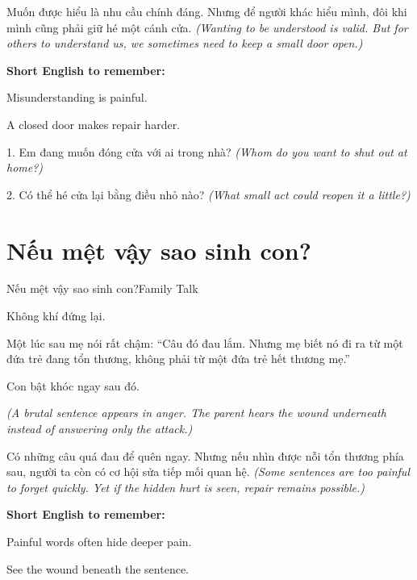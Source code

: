 \begin{baihoc}
Muốn được hiểu là nhu cầu chính đáng. Nhưng để người khác hiểu mình, đôi khi mình cũng phải giữ hé một cánh cửa.
\textit{(Wanting to be understood is valid. But for others to understand us, we sometimes need to keep a small door open.)}
\end{baihoc}

\begin{ghinhoanh}
\textbf{Short English to remember:}

Misunderstanding is painful.

A closed door makes repair harder.
\end{ghinhoanh}

\begin{tuhocnhanh}
1. Em đang muốn đóng cửa với ai trong nhà? \textit{(Whom do you want to shut out at home?)}

2. Có thể hé cửa lại bằng điều nhỏ nào? \textit{(What small act could reopen it a little?)}
\end{tuhocnhanh}
\ngancach

\section{Nếu mệt vậy sao sinh con?}
\begin{truyen}{Nếu mệt vậy sao sinh con?}{Family Talk}

Không khí đứng lại.

Một lúc sau mẹ nói rất chậm: ``Câu đó đau lắm. Nhưng mẹ biết nó đi ra từ một đứa trẻ đang tổn thương, không phải từ một đứa trẻ hết thương mẹ.''

Con bật khóc ngay sau đó.

\textit{(A brutal sentence appears in anger. The parent hears the wound underneath instead of answering only the attack.)}
\end{truyen}

\begin{baihoc}
Có những câu quá đau để quên ngay. Nhưng nếu nhìn được nỗi tổn thương phía sau, người ta còn có cơ hội sửa tiếp mối quan hệ.
\textit{(Some sentences are too painful to forget quickly. Yet if the hidden hurt is seen, repair remains possible.)}
\end{baihoc}

\begin{ghinhoanh}
\textbf{Short English to remember:}

Painful words often hide deeper pain.

See the wound beneath the sentence.
\end{ghinhoanh}

